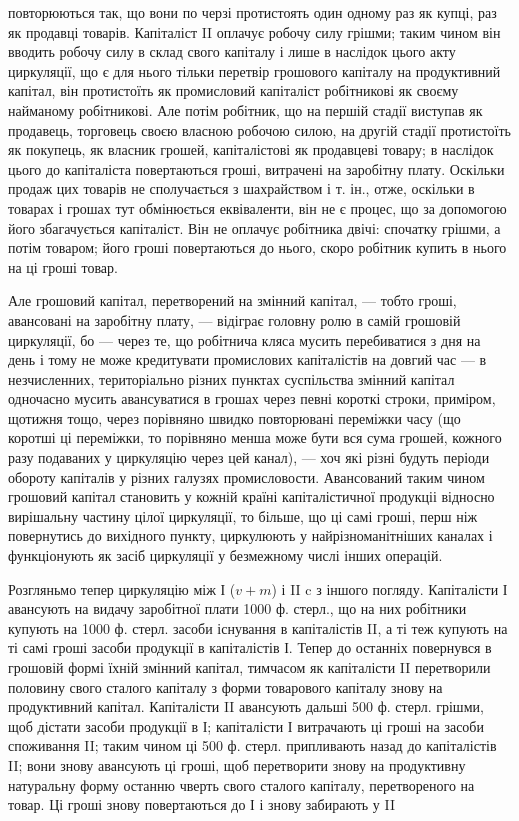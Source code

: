 \parcont{}  %
повторюються так, що вони по черзі протистоять один одному раз як
купці, раз як продавці товарів. Капіталіст II оплачує робочу силу грішми;
таким чином він вводить робочу силу в склад свого капіталу і лише
в наслідок цього акту циркуляції, що є для нього тільки перетвір грошового
капіталу на продуктивний капітал, він протистоїть як промисловий
капіталіст робітникові як своєму найманому робітникові. Але
потім робітник, що на першій стадії виступав як продавець, торговець
своєю власною робочою силою, на другій стадії протистоїть як покупець,
як власник грошей, капіталістові як продавцеві товару; в наслідок цього
до капіталіста повертаються гроші, витрачені на заробітну плату. Оскільки
продаж цих товарів не сполучається з шахрайством і т. ін., отже,
оскільки в товарах і грошах тут обмінюється еквіваленти, він не є процес,
що за допомогою його збагачується капіталіст. Він не оплачує
робітника двічі: спочатку грішми, а потім товаром; його гроші повертаються
до нього, скоро робітник купить в нього на ці гроші товар.

Але грошовий капітал, перетворений на змінний капітал, — тобто гроші,
авансовані на заробітну плату, — відіграє головну ролю в самій грошовій
циркуляції, бо — через те, що робітнича кляса мусить перебиватися з
дня на день і тому не може кредитувати промислових капіталістів на
довгий час — в незчисленних, територіально різних пунктах суспільства
змінний капітал одночасно мусить авансуватися в грошах через певні
короткі строки, приміром, щотижня тощо, через порівняно швидко
повторювані переміжки часу (що коротші ці переміжки, то порівняно
менша може бути вся сума грошей, кожного разу подаваних у
циркуляцію через цей канал), — хоч які різні будуть періоди обороту
капіталів у різних галузях промисловости. Авансований таким чином грошовий
капітал становить у кожній країні капіталістичної продукціі відносно
вирішальну частину цілої циркуляції, то більше, що ці самі гроші,
перш ніж повернутись до вихідного пункту, циркулюють у найрізноманітніших
каналах і функціонують як засіб циркуляції у безмежному числі
інших операцій.

Розгляньмо тепер циркуляцію між І ($v + m$) і II c з іншого погляду.
Капіталісти І авансують на видачу заробітної плати 1000 ф. стерл.,
що на них робітники купують на 1000 ф. стерл. засоби існування в капіталістів
II, а ті теж купують на ті самі гроші засоби продукції в капіталістів
І. Тепер до останніх повернувся в грошовій формі їхній змінний
капітал, тимчасом як капіталісти II перетворили половину свого сталого
капіталу з форми товарового капіталу знову на продуктивний капітал.
Капіталісти II авансують дальші 500 ф. стерл. грішми, щоб дістати засоби
продукції в І; капіталісти І витрачають ці гроші на засоби споживання
II; таким чином ці 500 ф. стерл. припливають назад до капіталістів II;
вони знову авансують ці гроші, щоб перетворити знову на продуктивну
натуральну форму останню чверть свого сталого капіталу, перетвореного
на товар. Ці гроші знову повертаються до І і знову забирають у II
\parbreak{}  %
